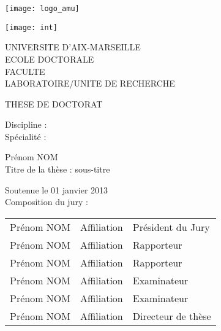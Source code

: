 \titlepage
{}\selectfont{}
\vspace*{-2cm}
\begin{center}
	\begin{minipage}[c]{0.25\linewidth}
		\raggedright \texttt{[image: logo\_amu]}
	\end{minipage}\hfill
	\begin{minipage}[c]{0.25\linewidth}
		\raggedleft \texttt{[image: int]}
	\end{minipage}\hfill 
\end{center}
\begin{flushleft}
	\vspace{0.2cm}
	\LARGE UNIVERSITE D’AIX-MARSEILLE\\
	\vspace{0.2cm}
	\Large ECOLE DOCTORALE\\
	\vspace{0.2cm}
	\normalsize FACULTE\\
	\vspace{0.2cm}
	LABORATOIRE/UNITE DE RECHERCHE\\
    \begin{center}
		\vspace{2cm}
		THESE DE DOCTORAT\\
    \end{center}
	\vspace{0.5cm}
    Discipline :\\
    Spécialité :\\
    \begin{center}
        \vspace{0.5cm}
        \Large Prénom NOM\\
        \vspace{1cm}
        \large Titre de la thèse : sous-titre\\
    \end{center}
	\vspace{3cm}
    \normalsize Soutenue le 01 janvier 2013\\
	\vspace{0.4cm}
    Composition du jury :\\
\end{flushleft}
\vspace{0.4cm}
\begin{tabular}{lll}
	Prénom NOM & Affiliation & Président du Jury \\
    \vspace{0.08cm}
	Prénom NOM & Affiliation & Rapporteur \\
    \vspace{0.08cm}
	Prénom NOM & Affiliation & Rapporteur \\
    \vspace{0.08cm}
	Prénom NOM & Affiliation & Examinateur \\
    \vspace{0.08cm}
	Prénom NOM & Affiliation & Examinateur \\
    \vspace{0.08cm}
	Prénom NOM & Affiliation & Directeur de thèse \\
\end{tabular}
\selectfont{}